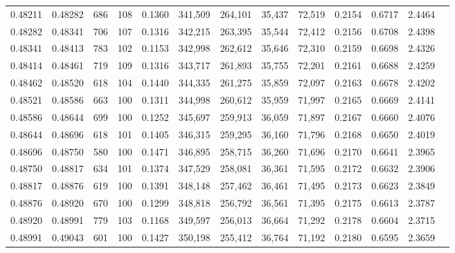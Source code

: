 \begin{tabular}{rrrrrrrrrrrrr}
0.48211 & 0.48282 &   686 & 108 &                                     0.1360 & 341,509 & 264,101 &  35,437 &  72,519 & 0.2154 & 0.6717 & 2.4464 \\
0.48282 & 0.48341 &   706 & 107 &                                     0.1316 & 342,215 & 263,395 &  35,544 &  72,412 & 0.2156 & 0.6708 & 2.4398 \\
0.48341 & 0.48413 &   783 & 102 &                                     0.1153 & 342,998 & 262,612 &  35,646 &  72,310 & 0.2159 & 0.6698 & 2.4326 \\
0.48414 & 0.48461 &   719 & 109 &                                     0.1316 & 343,717 & 261,893 &  35,755 &  72,201 & 0.2161 & 0.6688 & 2.4259 \\
0.48462 & 0.48520 &   618 & 104 &                                     0.1440 & 344,335 & 261,275 &  35,859 &  72,097 & 0.2163 & 0.6678 & 2.4202 \\
0.48521 & 0.48586 &   663 & 100 &                                     0.1311 & 344,998 & 260,612 &  35,959 &  71,997 & 0.2165 & 0.6669 & 2.4141 \\
0.48586 & 0.48644 &   699 & 100 &                                     0.1252 & 345,697 & 259,913 &  36,059 &  71,897 & 0.2167 & 0.6660 & 2.4076 \\
0.48644 & 0.48696 &   618 & 101 &                                     0.1405 & 346,315 & 259,295 &  36,160 &  71,796 & 0.2168 & 0.6650 & 2.4019 \\
0.48696 & 0.48750 &   580 & 100 &                                     0.1471 & 346,895 & 258,715 &  36,260 &  71,696 & 0.2170 & 0.6641 & 2.3965 \\
0.48750 & 0.48817 &   634 & 101 &                                     0.1374 & 347,529 & 258,081 &  36,361 &  71,595 & 0.2172 & 0.6632 & 2.3906 \\
0.48817 & 0.48876 &   619 & 100 &                                     0.1391 & 348,148 & 257,462 &  36,461 &  71,495 & 0.2173 & 0.6623 & 2.3849 \\
0.48876 & 0.48920 &   670 & 100 &                                     0.1299 & 348,818 & 256,792 &  36,561 &  71,395 & 0.2175 & 0.6613 & 2.3787 \\
0.48920 & 0.48991 &   779 & 103 &                                     0.1168 & 349,597 & 256,013 &  36,664 &  71,292 & 0.2178 & 0.6604 & 2.3715 \\
0.48991 & 0.49043 &   601 & 100 &                                     0.1427 & 350,198 & 255,412 &  36,764 &  71,192 & 0.2180 & 0.6595 & 2.3659 \\

\end{tabular}
